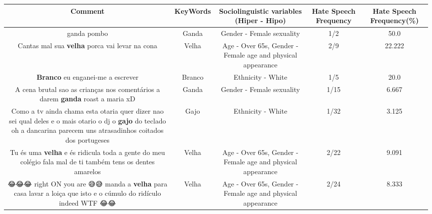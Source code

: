 \documentclass[11pt]{article}
\newlength\mylength
\begin{document}
\begin{center}
\setlength\mylength{\dimexpr\textwidth - 1\arrayrulewidth - 50\tabcolsep}
\begin{longtable}{|C{.65\mylength}|C{.30\mylength}|C{.12\mylength}|C{.12\mylength}|C{.12\mylength}|}
\hline
\textbf{Comment} & \textbf{KeyWords} & \textbf{Sociolinguistic variables (Hiper - Hipo)}  & \textbf{Hate Speech Frequency} & \textbf{Hate Speech Frequency(\%)} \\
\hline{}\small ganda pombo\normalsize   & Ganda & Gender - Female sexuality & 1/2 & 50.0 \\  \hline
  \small Cantas mal sua \textbf{v\textbf{elha}} porca vai levar na cona\normalsize   & Velha & Age - Over 65s, Gender - Female age and physical appearance & 2/9 & 22.222 \\  \hline
  \small \@\textbf{Branco} eu enganei-me a escrever\normalsize   & Branco & Ethnicity - White & 1/5 & 20.0 \\  \hline
  \small A cena brutal sao as crianças nos comentários a darem \textbf{ganda} roast a maria xD\normalsize   & Ganda & Gender - Female sexuality & 1/15 & 6.667 \\  \hline
  \small Como a tv ainda chama esta otaria quer  dizer nao sei qual deles e o mais otario o dj o \textbf{gajo} do teclado oh a dancarina parecem uns atrasadinhos coitados dos portugeses\normalsize   & Gajo & Ethnicity - White & 1/32 & 3.125 \\  \hline
  \small Tu és uma \textbf{v\textbf{elha}}  e és ridicula toda a gente do meu colégio fala mal de ti também tens os dentes amarelos\normalsize   & Velha & Age - Over 65s, Gender - Female age and physical appearance & 2/22 & 9.091 \\  \hline
  \small 😂😂😂  right ON you are 😅😅 manda a \textbf{v\textbf{elha}} para casa lavar a loiça que isto e o cúmulo do ridículo indeed WTF 😂😂\normalsize   & Velha & Age - Over 65s, Gender - Female age and physical appearance & 2/24 & 8.333 \\  \hline

\end{longtable}
\end{center}
\end{document}

